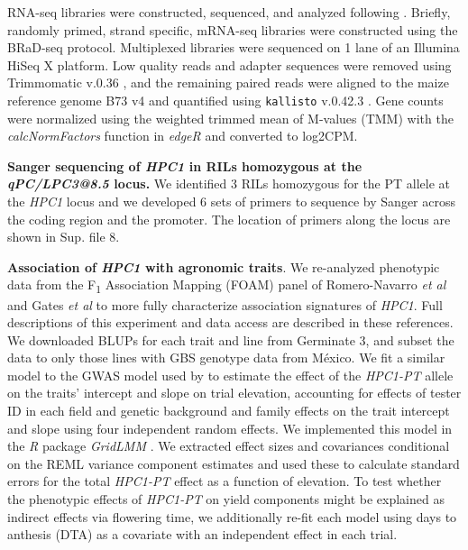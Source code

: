 \documentclass[9pt,twocolumn,twoside,lineno]{biorxiv}
\newcommand{\hpc}{\textit{HPC1}\xspace}
\begin{document}
RNA-seq libraries were constructed, sequenced, and analyzed following \cite{Crow2020-gene}. 
Briefly, randomly primed, strand specific, mRNA-seq libraries were constructed using the BRaD-seq \cite{townsley2015brad} protocol.
Multiplexed libraries were sequenced on 1 lane of an Illumina HiSeq X platform. 
Low quality reads and adapter sequences were removed using Trimmomatic v.0.36 \cite{bolger2014trimmomatic}, and the remaining paired reads were aligned to the maize reference genome B73 v4 and quantified using \texttt{kallisto} v.0.42.3 \cite{bray2016near}. 
Gene counts were normalized using the weighted trimmed mean of M-values (TMM) with the \textit{calcNormFactors} function in \textit{edgeR} \cite{robinson2010edger} and converted to log2CPM.

\textbf{Sanger sequencing of \hpc in RILs homozygous at the \textit{qPC/LPC3@8.5} locus.}
We identified 3 RILs homozygous for the PT allele at the \hpc locus and we developed 6 sets of primers to sequence by Sanger across the coding region and the promoter. 
The location of primers along the locus are shown in Sup. file 8. 

\textbf{Association of \hpc with agronomic traits}.
We re-analyzed phenotypic data from the F\textsubscript{1} Association Mapping (FOAM) panel of Romero-Navarro \textit{et al} \cite{Romero_Navarro2017-cn} and Gates \textit{et al} \cite{Gates2019-xu} to more fully characterize association signatures of \hpc. 
Full descriptions of this experiment and data access are described in these references. 
We downloaded BLUPs for each trait and line from Germinate 3, and subset the data to only those lines with GBS genotype data from M\'exico. 
We fit a similar model to the GWAS model used by \cite{Gates2019-xu} to estimate the effect of the \textit{HPC1-PT} allele on the traits' intercept and slope on trial elevation, accounting for effects of tester ID in each field and genetic background and family effects on the trait intercept and slope using four independent random effects. 
We implemented this model in the \textit{R} package \textit{GridLMM} \cite{Runcie2019-Gr}. 
We extracted effect sizes and covariances conditional on the REML variance component estimates and used these to calculate standard errors for the total \textit{HPC1-PT} effect as a function of elevation. 
To test whether the phenotypic effects of \textit{HPC1-PT} on yield components might be explained as indirect effects via flowering time, we additionally re-fit each model using days to anthesis (DTA) as a covariate with an independent effect in each trial.
\end{document}
